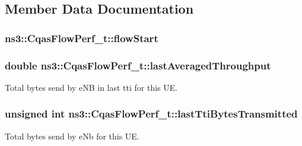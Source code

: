 \subsection{Member Data Documentation}
\subsubsection[{\texorpdfstring{flow\+Start}{flowStart}}]{ ns3\+::\+Cqas\+Flow\+Perf\+\_\+t\+::flow\+Start}\hypertarget{structns3_1_1CqasFlowPerf__t_a5ae2bde0cf5059f6bcbb7871f0c1dcc7}{}\label{structns3_1_1CqasFlowPerf__t_a5ae2bde0cf5059f6bcbb7871f0c1dcc7}
\subsubsection[{\texorpdfstring{last\+Averaged\+Throughput}{lastAveragedThroughput}}]{\setlength{\rightskip}{0pt plus 5cm}double ns3\+::\+Cqas\+Flow\+Perf\+\_\+t\+::last\+Averaged\+Throughput}\hypertarget{structns3_1_1CqasFlowPerf__t_a3f95a06a46bf4b42a598f397ac98c644}{}\label{structns3_1_1CqasFlowPerf__t_a3f95a06a46bf4b42a598f397ac98c644}


Total bytes send by e\+NB in last tti for this UE. 

\subsubsection[{\texorpdfstring{last\+Tti\+Bytes\+Transmitted}{lastTtiBytesTransmitted}}]{\setlength{\rightskip}{0pt plus 5cm}unsigned int ns3\+::\+Cqas\+Flow\+Perf\+\_\+t\+::last\+Tti\+Bytes\+Transmitted}\hypertarget{structns3_1_1CqasFlowPerf__t_a7e0b80e8566c58f757542c23fb35a2dd}{}\label{structns3_1_1CqasFlowPerf__t_a7e0b80e8566c58f757542c23fb35a2dd}


Total bytes send by e\+Nb for this UE. 

